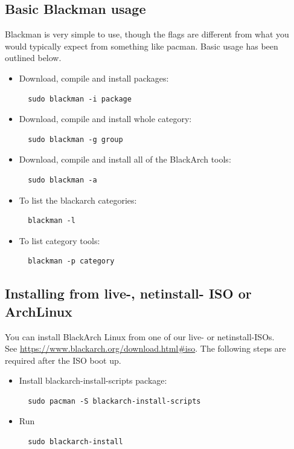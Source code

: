 \documentclass[a4paper, oneside, 11pt]{book}
\begin{document}
\subsection{Basic Blackman usage} Blackman is very simple to use, though the flags are different from what you
would typically expect from something like pacman. Basic usage has been outlined below.
\begin{itemize}
\item Download, compile and install packages:
\begin{lstlisting}
  sudo blackman -i package
\end{lstlisting}

\item Download, compile and install whole category:
\begin{lstlisting}
  sudo blackman -g group
\end{lstlisting}

\item Download, compile and install all of the BlackArch tools:
\begin{lstlisting}
  sudo blackman -a
\end{lstlisting}

\item To list the blackarch categories:
\begin{lstlisting}
  blackman -l
\end{lstlisting}

\item To list category tools:
\begin{lstlisting}
  blackman -p category
\end{lstlisting}

\end{itemize}

\subsection{Installing from live-, netinstall- ISO or ArchLinux}
You can install BlackArch Linux from one of our live- or netinstall-ISOs.\\See
\url{https://www.blackarch.org/download.html#iso}. The following steps are
required after the ISO boot up.
\begin{itemize}
\item Install blackarch-install-scripts package:
\begin{lstlisting}
  sudo pacman -S blackarch-install-scripts
\end{lstlisting}

\item Run
\begin{lstlisting}
  sudo blackarch-install
\end{lstlisting}

\end{itemize}
\end{document}
